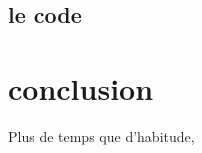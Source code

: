 \documentclass[11pt,a4paper]{article}
\begin{document}
\subsection{le code}



\section{conclusion}

Plus de temps que d'habitude, 



%
  	




\end{document}
